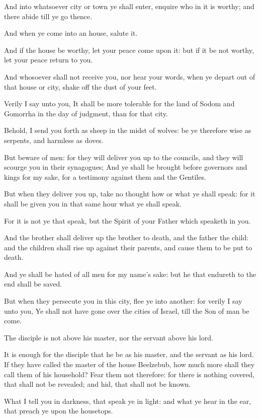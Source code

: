 \Verse And into whatsoever city or town ye shall enter, enquire who in it is worthy; and there abide till ye go thence.

\Verse And when ye come into an house, salute it.

\Verse And if the house be worthy, let your peace come upon it: but if it be not worthy, let your peace return to you.

\Verse And whosoever shall not receive you, nor hear your words, when ye depart out of that house or city, shake off the dust of your feet.

\Verse Verily I say unto you, It shall be more tolerable for the land of Sodom and Gomorrha in the day of judgment, than for that city.

\Verse Behold, I send you forth as sheep in the midst of wolves: be ye therefore wise as serpents, and harmless as doves.

\Verse But beware of men: for they will deliver you up to the councils, and they will scourge you in their synagogues; \Verse And ye shall be brought before governors and kings for my sake, for a testimony against them and the Gentiles.

\Verse But when they deliver you up, take no thought how or what ye shall speak: for it shall be given you in that same hour what ye shall speak.

\Verse For it is not ye that speak, but the Spirit of your Father which speaketh in you.

\Verse And the brother shall deliver up the brother to death, and the father the child: and the children shall rise up against their parents, and cause them to be put to death.

\Verse And ye shall be hated of all men for my name's sake: but he that endureth to the end shall be saved.

\Verse But when they persecute you in this city, flee ye into another: for verily I say unto you, Ye shall not have gone over the cities of Israel, till the Son of man be come.

\Verse The disciple is not above his master, nor the servant above his lord.

\Verse It is enough for the disciple that he be as his master, and the servant as his lord. If they have called the master of the house Beelzebub, how much more shall they call them of his household?  \Verse Fear them not therefore: for there is nothing covered, that shall not be revealed; and hid, that shall not be known.

\Verse What I tell you in darkness, that speak ye in light: and what ye hear in the ear, that preach ye upon the housetops.

